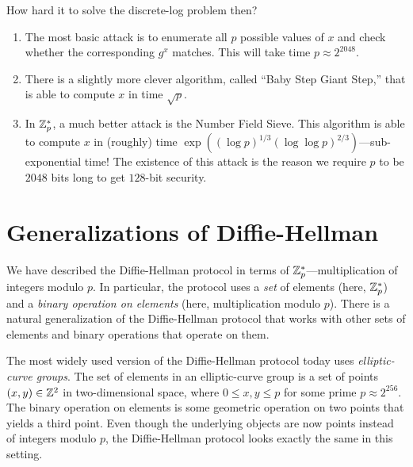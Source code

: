 How hard it to solve the discrete-log problem then?
\begin{enumerate}
	\item The most basic attack is to enumerate all $p$ possible values of $x$ and check whether the corresponding $g^x$ matches. This will take time $p \approx 2^{2048}$.
	\item There is a slightly more clever algorithm, called ``Baby Step Giant Step,'' that is able to compute $x$ in time $\sqrt{p}$.
  \item In $\mathbb{Z}^*_p$,
    a much better attack is the Number Field Sieve.
    This algorithm is able to compute $x$ in (roughly) time $\exp((\log p)^{1/3} (\log \log p)^{2/3})$---sub-exponential time!
    The existence of this attack is the reason we require $p$ to be $2048$ bits long to 
    get $128$-bit security.
\end{enumerate}






\section{Generalizations of Diffie-Hellman}

We have described the Diffie-Hellman protocol in terms
of $\mathbb{Z}^*_p$---multiplication of integers modulo $p$.
In particular, the protocol uses a \emph{set} of elements (here, $\mathbb{Z}^*_p$)
and a \emph{binary operation on elements} (here, multiplication modulo $p$).
There is a natural generalization of the Diffie-Hellman
protocol that works with other sets of elements and
binary operations that operate on them.

The most widely used version of the Diffie-Hellman protocol today
uses \emph{elliptic-curve groups}.
The set of elements in an elliptic-curve group is a set of points $(x,y) \in \mathbb{Z}^2$
in two-dimensional space, 
where $0 \leq x, y \leq p$ for some prime $p \approx 2^{256}$.
The binary operation on elements is some geometric operation
on two points that yields a third point.
Even though the underlying objects are now points instead of integers
modulo $p$, the Diffie-Hellman protocol looks exactly the same in this setting.

